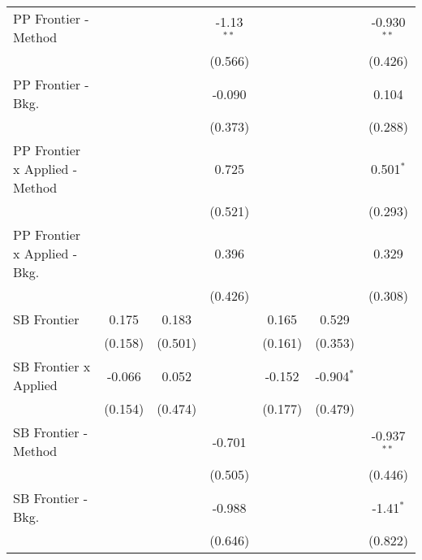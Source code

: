 \begin{tabular}{lcccccc}
   PP Frontier - Method           &               &             & -1.13$^{**}$ &               &              & -0.930$^{**}$\\   
                                  &               &             & (0.566)      &               &              & (0.426)\\   
   PP Frontier - Bkg.             &               &             & -0.090       &               &              & 0.104\\   
                                  &               &             & (0.373)      &               &              & (0.288)\\   
   PP Frontier x Applied - Method &               &             & 0.725        &               &              & 0.501$^{*}$\\   
                                  &               &             & (0.521)      &               &              & (0.293)\\   
   PP Frontier x Applied - Bkg.   &               &             & 0.396        &               &              & 0.329\\   
                                  &               &             & (0.426)      &               &              & (0.308)\\   
   SB Frontier                    & 0.175         & 0.183       &              & 0.165         & 0.529        &   \\   
                                  & (0.158)       & (0.501)     &              & (0.161)       & (0.353)      &   \\   
   SB Frontier x Applied          & -0.066        & 0.052       &              & -0.152        & -0.904$^{*}$ &   \\   
                                  & (0.154)       & (0.474)     &              & (0.177)       & (0.479)      &   \\   
   SB Frontier - Method           &               &             & -0.701       &               &              & -0.937$^{**}$\\   
                                  &               &             & (0.505)      &               &              & (0.446)\\   
   SB Frontier - Bkg.             &               &             & -0.988       &               &              & -1.41$^{*}$\\   
                                  &               &             & (0.646)      &               &              & (0.822)\\   

\end{tabular}
